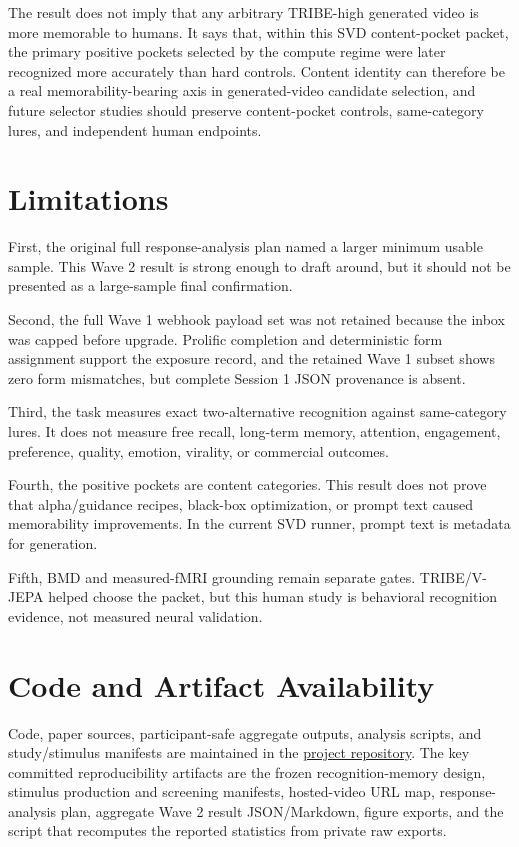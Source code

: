 \documentclass[11pt]{article}
\begin{document}
The result does not imply that any arbitrary TRIBE-high generated video is more
memorable to humans. It says that, within this SVD content-pocket packet, the
primary positive pockets selected by the compute regime were later recognized
more accurately than hard controls. Content identity can therefore be a real
memorability-bearing axis in generated-video candidate selection, and future
selector studies should preserve content-pocket controls, same-category lures,
and independent human endpoints.

\section{Limitations}

First, the original full response-analysis plan named a larger minimum usable
sample. This Wave 2 result is strong enough to draft around, but it should not
be presented as a large-sample final confirmation.

Second, the full Wave 1 webhook payload set was not retained because the inbox
was capped before upgrade. Prolific completion and deterministic form
assignment support the exposure record, and the retained Wave 1 subset shows
zero form mismatches, but complete Session 1 JSON provenance is absent.

Third, the task measures exact two-alternative recognition against same-category
lures. It does not measure free recall, long-term memory, attention,
engagement, preference, quality, emotion, virality, or commercial outcomes.

Fourth, the positive pockets are content categories. This result does not prove
that alpha/guidance recipes, black-box optimization, or prompt text caused
memorability improvements. In the current SVD runner, prompt text is metadata
for generation.

Fifth, BMD and measured-fMRI grounding remain separate gates. TRIBE/V-JEPA
helped choose the packet, but this human study is behavioral recognition
evidence, not measured neural validation.

\section{Code and Artifact Availability}

Code, paper sources, participant-safe aggregate outputs, analysis scripts, and
study/stimulus manifests are maintained in the
\href{https://github.com/jawauntb/audience-vectors-research}{project repository}.
The key committed
reproducibility artifacts are the frozen recognition-memory design, stimulus
production and screening manifests, hosted-video URL map, response-analysis
plan, aggregate Wave 2 result JSON/Markdown, figure exports, and the script that
recomputes the reported statistics from private raw exports.
\end{document}
